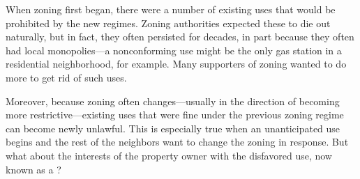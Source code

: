 When zoning first began, there were a number of existing uses that would be
prohibited by the new regimes. Zoning authorities expected these to die out
naturally, but in fact, they often persisted for decades, in part because they
often had local monopolies---a nonconforming use might be the only gas station
in a residential neighborhood, for example. Many supporters of zoning wanted to
do more to get rid of such uses.

Moreover, because zoning often changes---usually in the direction of becoming
more restrictive---existing uses that were fine under the previous zoning regime
can become newly unlawful. This is especially true when an unanticipated use
begins and the rest of the neighbors want to change the zoning in response. But
what about the interests of the property owner with the disfavored use, now
known as a ?

